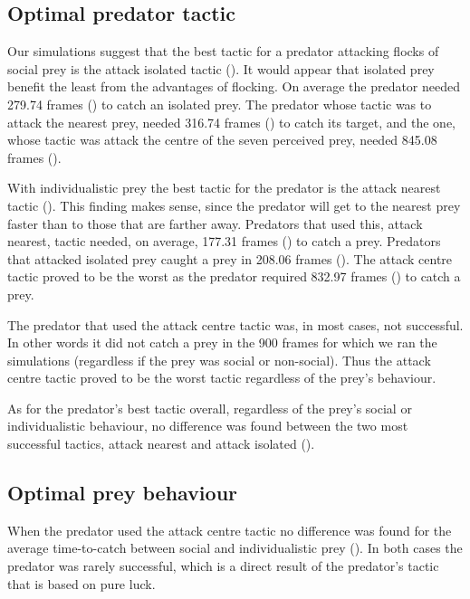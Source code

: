 \subsection{Optimal predator tactic}

Our simulations suggest that the best tactic for a predator attacking flocks of social prey is the attack isolated tactic (). It would appear that isolated prey benefit the least from the advantages of flocking. On average the predator needed \num{279.74} frames () to catch an isolated prey. The predator whose tactic was to attack the nearest prey, needed \num{316.74} frames () to catch its target, and the one, whose tactic was attack the centre of the seven perceived prey, needed \num{845.08} frames ().

With individualistic prey the best tactic for the predator is the attack nearest tactic (). This finding makes sense, since the predator will get to the nearest prey faster than to those that are farther away. Predators that used this, attack nearest, tactic needed, on average, \num{177.31} frames () to catch a prey. Predators that attacked isolated prey caught a prey in \num{208.06} frames (). The attack centre tactic proved to be the worst as the predator required \num{832.97} frames () to catch a prey.

The predator that used the attack centre tactic was, in most cases, not successful. In other words it did not catch a prey in the 900 frames for which we ran the simulations (regardless if the prey was social or non-social). Thus the attack centre tactic proved to be the worst tactic regardless of the prey's behaviour.

As for the predator's best tactic overall, regardless of the prey's social or individualistic behaviour, no difference was found between the two most successful tactics, attack nearest and attack isolated ().

\subsection{Optimal prey behaviour}

When the predator used the attack centre tactic no difference was found for the average time-to-catch between social and individualistic prey (). In both cases the predator was rarely successful, which is a direct result of the predator's tactic that is based on pure luck.

